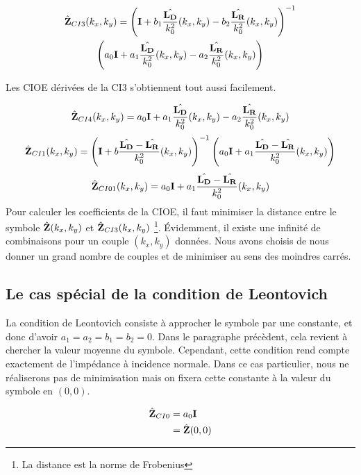     \begin{multline}
        \hat{\mathbf{Z}}_{CI3}(k_x,k_y) = \left(\mathbf{I} + b_1 \dfrac{\hat{\mathbf{L_D}}}{k_0^2}(k_x,k_y) - b_2 \dfrac{\hat{\mathbf{L_R}}}{k_0^2}(k_x,k_y) \right)^{-1}
        \\
        \left(a_0 \mathbf{I} + a_1 \dfrac{\hat{\mathbf{L_D}}}{k_0^2}(k_x,k_y) - a_2 \dfrac{\hat{\mathbf{L_R}}}{k_0^2}(k_x,k_y)\right)
    \end{multline}

    Les CIOE dérivées de la CI3 s'obtiennent tout aussi facilement.

    \begin{equation}
        \hat{\mathbf{Z}}_{CI4}(k_x,k_y) = a_0 \mathbf{I} + a_1 \dfrac{\hat{\mathbf{L_D}}}{k_0^2}(k_x,k_y) - a_2 \dfrac{\hat{\mathbf{L_R}}}{k_0^2}(k_x,k_y)
    \end{equation}
    \begin{equation}
        \hat{\mathbf{Z}}_{CI1}(k_x,k_y) =  \left(\mathbf{I} + b \dfrac{\hat{\mathbf{L_D}} - \hat{\mathbf{L_R}}}{k_0^2}(k_x,k_y) \right)^{-1}\left(a_0\mathbf{I} + a_1 \dfrac{\hat{\mathbf{L_D}} - \hat{\mathbf{L_R}}}{k_0^2}(k_x,k_y) \right)
    \end{equation}
    \begin{equation}
        \hat{\mathbf{Z}}_{CI01}(k_x,k_y) =  a_0\mathbf{I} + a_1 \dfrac{\hat{\mathbf{L_D}} - \hat{\mathbf{L_R}}}{k_0^2}(k_x,k_y)
    \end{equation}
    Pour calculer les coefficients de la CIOE, il faut minimiser la distance entre le symbole \(\hat{\mathbf{Z}}(k_x,k_y)\) et \(\hat{\mathbf{Z}}_{CI3}(k_x,k_y)\) \footnote{La distance est la norme de Frobenius}. Évidemment, il existe une infinité de combinaisons pour un couple \((k_x,k_y)\) données. Nous avons choisis de nous donner un grand nombre de couples et de minimiser au sens des moindres carrés.

  \subsection{Le cas spécial de la condition de Leontovich}

    La condition de Leontovich consiste à approcher le symbole par une constante, et donc d'avoir \(a_1=a_2=b_1=b_2=0\). Dans le paragraphe précèdent, cela revient à chercher la valeur moyenne du symbole. Cependant, cette condition rend compte exactement de l'impédance à incidence normale. Dans ce cas particulier, nous ne réaliserons pas de minimisation mais on fixera cette constante à la valeur du symbole en \((0,0)\).

    \begin{align}
      \hat{\mathbf{Z}}_{CI0} & = a_0\mathbf{I} 
      \\
      &= \hat{\mathbf{Z}}(0,0)
    \end{align}